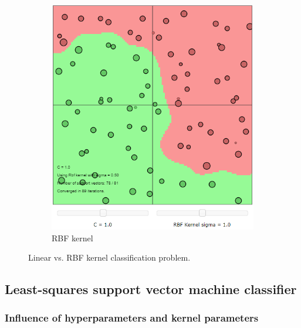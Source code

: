 \documentclass{article}
\begin{document}
\begin{figure}[h]
\begin{subfigure}[b]{0.3\textwidth}
                 \includegraphics[width=\textwidth]{Assignment 1/figures/linear_vs_rbf_2.png}
                 \caption{RBF kernel}
                 \label{fig:linear_kernel_vs_rbf_2}
             \end{subfigure}
             \hspace{0.15\textwidth}
            \caption{Linear vs. RBF kernel classification problem. }
        \end{figure}
        
    \subsection{Least-squares support vector machine classifier}
    
        \subsubsection{Influence of hyperparameters and kernel parameters}
            
\end{document}
